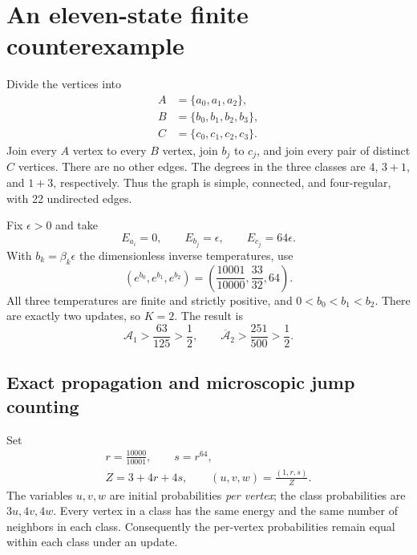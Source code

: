 \documentclass[aps,pre,reprint,longbibliography,nofootinbib,floatfix]{revtex4-2}
\newcommand{\Act}{\mathcal A}
\newcommand{\eps}{\epsilon}
\begin{document}
\section{An eleven-state finite counterexample}
Divide the vertices into
\begin{equation}
\begin{aligned}
A&=\{a_0,a_1,a_2\},\\
B&=\{b_0,b_1,b_2,b_3\},\\
C&=\{c_0,c_1,c_2,c_3\}.
\end{aligned}
\end{equation}
Join every $A$ vertex to every $B$ vertex, join $b_j$ to $c_j$, and join
every pair of distinct $C$ vertices. There are no other edges. The degrees
in the three classes are $4$, $3+1$, and $1+3$, respectively. Thus the
graph is simple, connected, and four-regular, with 22 undirected edges.

Fix $\eps>0$ and take
\begin{equation}
E_{a_i}=0,\qquad E_{b_j}=\eps,\qquad E_{c_j}=64\eps.
\label{eq:energies}
\end{equation}
With $b_k=\beta_k\eps$ the dimensionless inverse temperatures, use
\begin{equation}
(e^{b_0},e^{b_1},e^{b_2})=
\left(\frac{10001}{10000},\frac{33}{32},64\right).
\label{eq:protocol}
\end{equation}
All three temperatures are finite and strictly positive, and
$0<b_0<b_1<b_2$. There are exactly two updates, so $K=2$.
The result is
\begin{equation}
\boxed{\Act_1>\frac{63}{125}>\frac12,\qquad
\overline{\Act}_2>\frac{251}{500}>\frac12.}
\label{eq:result}
\end{equation}

\subsection{Exact propagation and microscopic jump counting}
Set
\begin{equation}
\begin{gathered}
r=\frac{10000}{10001},\qquad s=r^{64},\\
Z=3+4r+4s,\qquad (u,v,w)=\frac{(1,r,s)}{Z}.
\end{gathered}
\label{eq:initial}
\end{equation}
The variables $u,v,w$ are initial probabilities \emph{per vertex}; the
class probabilities are $3u,4v,4w$. Every vertex in a class has the same
energy and the same number of neighbors in each class. Consequently the
per-vertex probabilities remain equal within each class under an update.
\end{document}

